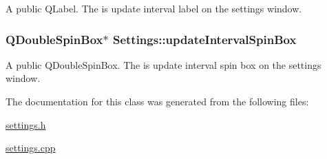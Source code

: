 \label{classSettings_a292d6416ebf86b8e3a58bda7075e4f3e}
A public QLabel. The is update interval label on the settings window. \hypertarget{classSettings_a9bf9ab18da308f29adbd46dbc2302c6c}{
\subsubsection[{updateIntervalSpinBox}]{\setlength{\rightskip}{0pt plus 5cm}QDoubleSpinBox$\ast$ {\bf Settings::updateIntervalSpinBox}}}
\label{classSettings_a9bf9ab18da308f29adbd46dbc2302c6c}
A public QDoubleSpinBox. The is update interval spin box on the settings window. 

The documentation for this class was generated from the following files:\begin{DoxyCompactItemize}
\item 
\hyperlink{settings_8h}{settings.h}\item 
\hyperlink{settings_8cpp}{settings.cpp}\end{DoxyCompactItemize}
